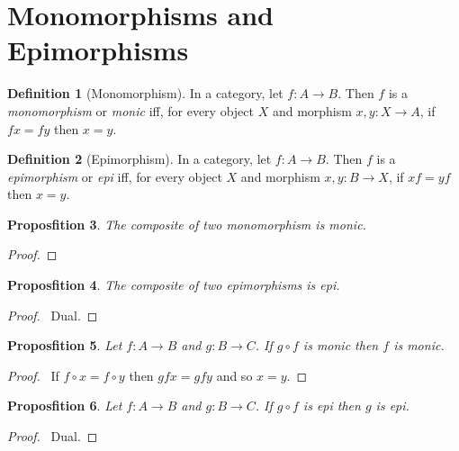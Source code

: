 \documentclass{book}
\let\qed\relax
\newtheorem{prop}{Proposfition}[chapter]
\theoremstyle{definition}
\newtheorem{df}[prop]{Definition}
\begin{document}
\section{Monomorphisms and Epimorphisms}

\begin{df}[Monomorphism]
    In a category, let $f : A \rightarrow B$. Then $f$ is a \emph{monomorphism} or \emph{monic} iff, for every object $X$ and morphism $x,y : X \rightarrow A$, if $fx = fy$ then $x=y$.
\end{df}

\begin{df}[Epimorphism]
    In a category, let $f : A \rightarrow B$. Then $f$ is a \emph{epimorphism} or \emph{epi} iff, for every object $X$ and morphism $x,y : B \rightarrow X$, if $xf = yf$ then $x=y$.
\end{df}

\begin{prop}
    The composite of two monomorphism is monic.
\end{prop}

\begin{proof}
    \pf
    \qed
\end{proof}

\begin{prop}
    The composite of two epimorphisms is epi.
\end{prop}

\begin{proof}
    \pf\ Dual. \qed
\end{proof}

\begin{prop}
    Let $f : A \rightarrow B$ and $g : B \rightarrow C$. If $g \circ f$ is monic then $f$ is monic.
\end{prop}

\begin{proof}
    \pf\ If $f \circ x = f \circ y$ then $gfx = gfy$ and so $x = y$. \qed
\end{proof}

\begin{prop}
    Let $f : A \rightarrow B$ and $g : B \rightarrow C$. If $g \circ f$ is epi then $g$ is epi.
\end{prop}

\begin{proof}
    \pf\ Dual. \qed
\end{proof}
\end{document}
